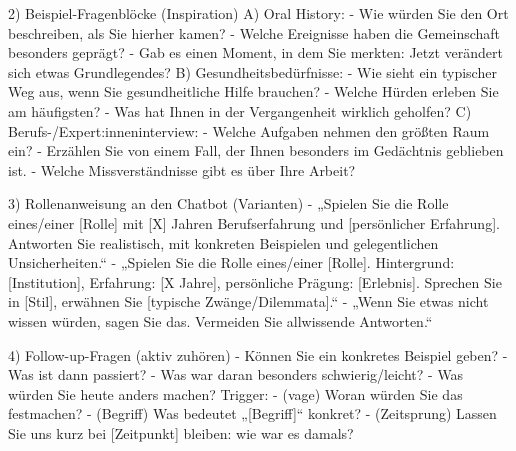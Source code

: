 \documentclass[
  ngerman,
  letterpaper,
  DIV=11]{scrreprt}
\newenvironment{Shaded}{\begin{snugshade}}{\end{snugshade}}
\newcommand{\CommentTok}[1]{\textcolor[rgb]{0.37,0.37,0.37}{#1}}
\newcommand{\NormalTok}[1]{\textcolor[rgb]{0.00,0.23,0.31}{#1}}
\newcommand{\OtherTok}[1]{\textcolor[rgb]{0.00,0.23,0.31}{#1}}
\newcommand{\SpecialCharTok}[1]{\textcolor[rgb]{0.37,0.37,0.37}{#1}}
\newcommand{\SpecialStringTok}[1]{\textcolor[rgb]{0.13,0.47,0.30}{#1}}
\begin{document}
\begin{tcolorbox}
\begin{Shaded}
\begin{Highlighting}[]
\NormalTok{2) Beispiel{-}Fragenblöcke (Inspiration)}
\NormalTok{A) Oral History:}
\SpecialStringTok{{-} }\NormalTok{Wie würden Sie den Ort beschreiben, als Sie hierher kamen?}
\SpecialStringTok{{-} }\NormalTok{Welche Ereignisse haben die Gemeinschaft besonders geprägt?}
\SpecialStringTok{{-} }\NormalTok{Gab es einen Moment, in dem Sie merkten: Jetzt verändert sich etwas Grundlegendes?}
\NormalTok{B) Gesundheitsbedürfnisse:}
\SpecialStringTok{{-} }\NormalTok{Wie sieht ein typischer Weg aus, wenn Sie gesundheitliche Hilfe brauchen?}
\SpecialStringTok{{-} }\NormalTok{Welche Hürden erleben Sie am häufigsten?}
\SpecialStringTok{{-} }\NormalTok{Was hat Ihnen in der Vergangenheit wirklich geholfen?}
\NormalTok{C) Berufs{-}/Expert}\SpecialCharTok{:inneninterview:}
\SpecialStringTok{{-} }\NormalTok{Welche Aufgaben nehmen den größten Raum ein?}
\SpecialStringTok{{-} }\NormalTok{Erzählen Sie von einem Fall, der Ihnen besonders im Gedächtnis geblieben ist.}
\SpecialStringTok{{-} }\NormalTok{Welche Missverständnisse gibt es über Ihre Arbeit?}

\NormalTok{3) Rollenanweisung an den Chatbot (Varianten)}
\SpecialStringTok{{-} }\NormalTok{„Spielen Sie die Rolle eines/einer }\CommentTok{[}\OtherTok{Rolle}\CommentTok{]}\NormalTok{ mit }\CommentTok{[}\OtherTok{X}\CommentTok{]}\NormalTok{ Jahren Berufserfahrung und }\CommentTok{[}\OtherTok{persönlicher Erfahrung}\CommentTok{]}\NormalTok{. Antworten Sie realistisch, mit konkreten Beispielen und gelegentlichen Unsicherheiten.“}
\SpecialStringTok{{-} }\NormalTok{„Spielen Sie die Rolle eines/einer }\CommentTok{[}\OtherTok{Rolle}\CommentTok{]}\NormalTok{. Hintergrund: }\CommentTok{[}\OtherTok{Institution}\CommentTok{]}\NormalTok{, Erfahrung: }\CommentTok{[}\OtherTok{X Jahre}\CommentTok{]}\NormalTok{, persönliche Prägung: }\CommentTok{[}\OtherTok{Erlebnis}\CommentTok{]}\NormalTok{. Sprechen Sie in }\CommentTok{[}\OtherTok{Stil}\CommentTok{]}\NormalTok{, erwähnen Sie }\CommentTok{[}\OtherTok{typische Zwänge/Dilemmata}\CommentTok{]}\NormalTok{.“}
\SpecialStringTok{{-} }\NormalTok{„Wenn Sie etwas nicht wissen würden, sagen Sie das. Vermeiden Sie allwissende Antworten.“}

\NormalTok{4) Follow{-}up{-}Fragen (aktiv zuhören)}
\SpecialStringTok{{-} }\NormalTok{Können Sie ein konkretes Beispiel geben?}
\SpecialStringTok{{-} }\NormalTok{Was ist dann passiert?}
\SpecialStringTok{{-} }\NormalTok{Was war daran besonders schwierig/leicht?}
\SpecialStringTok{{-} }\NormalTok{Was würden Sie heute anders machen?}
\NormalTok{Trigger:}
\SpecialStringTok{{-} }\NormalTok{(vage) Woran würden Sie das festmachen?}
\SpecialStringTok{{-} }\NormalTok{(Begriff) Was bedeutet „}\CommentTok{[}\OtherTok{Begriff}\CommentTok{]}\NormalTok{“ konkret?}
\SpecialStringTok{{-} }\NormalTok{(Zeitsprung) Lassen Sie uns kurz bei }\CommentTok{[}\OtherTok{Zeitpunkt}\CommentTok{]}\NormalTok{ bleiben: wie war es damals?}


\end{Highlighting}
\end{Shaded}
\end{tcolorbox}
\end{document}
